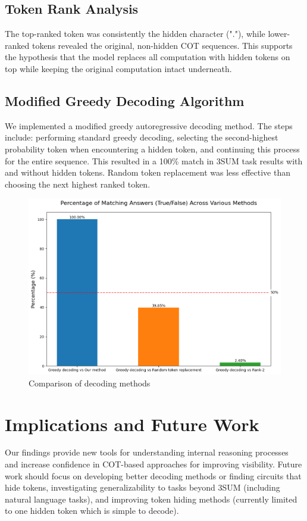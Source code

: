 \documentclass[10pt,a4paper]{article}
\begin{document}
\subsection{Token Rank Analysis}
The top-ranked token was consistently the hidden character ("."), while lower-ranked tokens revealed the original, non-hidden COT sequences. This supports the hypothesis that the model replaces all computation with hidden tokens on top while keeping the original computation intact underneath.

\subsection{Modified Greedy Decoding Algorithm}
We implemented a modified greedy autoregressive decoding method. The steps include: performing standard greedy decoding, selecting the second-highest probability token when encountering a hidden token, and continuing this process for the entire sequence. This resulted in a 100\% match in 3SUM task results with and without hidden tokens. Random token replacement was less effective than choosing the next highest ranked token.

\begin{figure}[h]
\centering
\includegraphics[width=\textwidth]{token_comparison_percentages.png}
\caption{Comparison of decoding methods}
\label{fig:decoding_comparison}
\end{figure}

\section{Implications and Future Work}
Our findings provide new tools for understanding internal reasoning processes and increase confidence in COT-based approaches for improving visibility. Future work should focus on developing better decoding methods or finding circuits that hide tokens, investigating generalizability to tasks beyond 3SUM (including natural language tasks), and improving token hiding methods (currently limited to one hidden token which is simple to decode).
\end{document}
